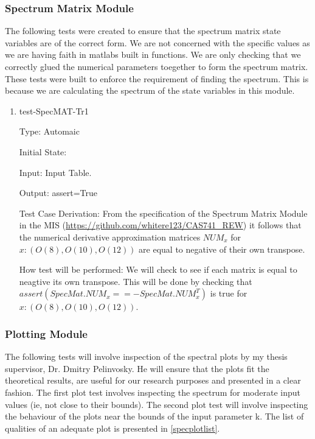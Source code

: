\documentclass[12pt, titlepage]{article}
\begin{document}
\subsubsection{Spectrum Matrix Module}

The following tests were created to ensure that the spectrum matrix state 
variables are of the correct form. We are not concerned with the specific 
values as we are having faith in matlabs built in functions. We are only 
checking that we correctly glued the numerical parameters toegether to form the 
spectrum matrix. \\ 
These tests were built to enforce the requirement of finding the spectrum. This 
is because we are calculating the spectrum of the state variables in this 
module. \\ 

\begin{enumerate}				

	\item{test-SpecMAT-Tr1\\}
	
	Type: Automaic
	
	Initial State: 
	
	Input: Input Table.
	
	Output: assert=True
	
	Test Case Derivation: From the specification of the Spectrum Matrix Module 
	in the MIS 
	(\url{https://github.com/whitere123/CAS741_REW}) it follows that 
	the numerical derivative approximation matrices $NUM_{x}$ for 
	$x:(O(8),O(10),O(12))$ are equal to negative of their own transpose.
	
	How test will be performed: We will check to see if each matrix is 
	equal to neagtive its own transpose. This will be done by checking that 
	$assert( 
	SpecMat.NUM_{x} == -SpecMat.NUM_{x}^{T} ) $ is true for $x: ( O(8), 
	O(10), O(12) )$.  
		
\end{enumerate} 

\subsubsection{Plotting Module} 

The following tests will involve inspection of the spectral plots by my thesis 
supervisor, Dr. Dmitry Pelinvosky. He will ensure that the plots fit the 
theoretical results, are useful for our research purposes and presented in a 
clear fashion. The first plot test involves inspecting the spectrum for 
moderate input values (ie, not close to their bounds). The second plot test 
will involve inspecting the behaviour of the plots near the bounds of the input 
parameter k. The list of qualities of an adequate plot is presented in 
\ref{specplotlist}. 
\end{document}
